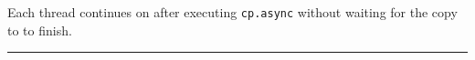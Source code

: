 


\newpage
{}

{\LARGE
Each thread continues on after executing \texttt{cp.async} without waiting for the copy to  to finish.


}
\vspace{5mm}
\hrule
\vspace{5mm}
{
\LARGE

}


\newpage
{}

